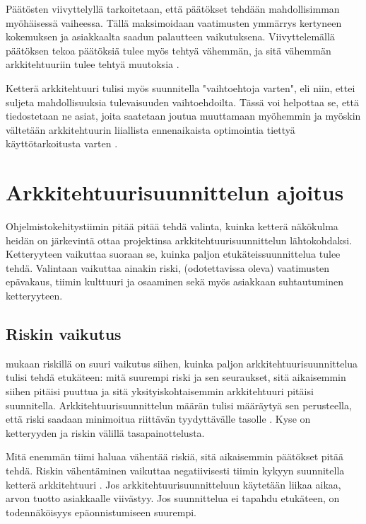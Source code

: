 Päätösten viivyttelyllä tarkoitetaan, että päätökset tehdään mahdollisimman myöhäisessä vaiheessa. Tällä maksimoidaan vaatimusten ymmärrys kertyneen kokemuksen ja asiakkaalta saadun palautteen vaikutuksena. Viivyttelemällä päätöksen tekoa päätöksiä tulee myös tehtyä vähemmän, ja sitä vähemmän arkkitehtuuriin tulee tehtyä muutoksia \citep{waterman_agility_2018}.

Ketterä arkkitehtuuri tulisi myös suunnitella "vaihtoehtoja varten", eli niin, ettei suljeta mahdollisuuksia tulevaisuuden vaihtoehdoilta. Tässä voi helpottaa se, että tiedostetaan ne asiat, joita saatetaan joutua muuttamaan myöhemmin ja myöskin vältetään arkkitehtuurin liiallista ennenaikaista optimointia tiettyä käyttötarkoitusta varten \citep{waterman_agility_2018}.  


\chapter{Arkkitehtuurisuunnittelun ajoitus}
Ohjelmistokehitystiimin pitää pitää tehdä valinta, kuinka ketterä näkökulma heidän on järkevintä ottaa projektinsa arkkitehtuurisuunnittelun lähtokohdaksi. Ketteryyteen vaikuttaa suoraan se, kuinka paljon etukäteissuunnittelua tulee tehdä. Valintaan vaikuttaa ainakin riski, (odotettavissa oleva) vaatimusten epävakaus, tiimin kulttuuri ja osaaminen sekä myös asiakkaan suhtautuminen ketteryyteen.

\section{Riskin vaikutus}

\cite{waterman_agility_2018_2} mukaan riskillä on suuri vaikutus siihen, kuinka paljon arkkitehtuurisuunnittelua tulisi tehdä etukäteen: mitä suurempi riski ja sen seuraukset, sitä aikaisemmin siihen pitäisi puuttua ja sitä yksityiskohtaisemmin arkkitehtuuri pitäisi suunnitella. Arkkitehtuurisuunnittelun määrän tulisi määräytyä sen perusteella, että riski saadaan minimoitua riittävän tyydyttävälle tasolle \citep{fairbanks2010just}. Kyse on ketteryyden ja riskin välillä tasapainottelusta.

Mitä enemmän tiimi haluaa vähentää riskiä, sitä aikaisemmin päätökset pitää tehdä.
Riskin vähentäminen vaikuttaa negatiivisesti tiimin kykyyn suunnitella ketterä arkkitehtuuri \citep{waterman_agility_2018_2}. Jos arkkitehtuurisuunnitteluun käytetään liikaa aikaa, arvon tuotto asiakkaalle viivästyy. Jos suunnittelua ei tapahdu etukäteen, on todennäköisyys epäonnistumiseen suurempi.

